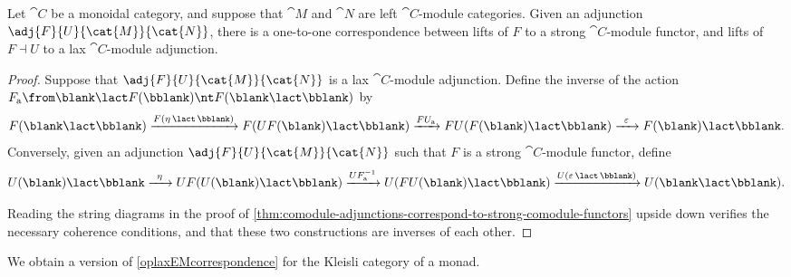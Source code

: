 \begin{proposition}\label{prop:dual-module-adjunctions}
  Let \(\cat{C}\) be a monoidal category,
  and suppose that \(\cat{M}\) and \(\cat{N}\) are left
  \(\cat{C}\)\hyp{}module categories.
  Given an adjunction \(\adj{F}{U}{\cat{M}}{\cat{N}}\),
  there is a one-to-one correspondence between
  lifts of \(F\) to a strong \(\cat{C}\)\hyp{}module functor,
  and lifts of \(F \dashv U\) to a lax \(\cat{C}\)\hyp{}module adjunction.
\end{proposition}
\begin{proof}
  Suppose that \(\adj{F}{U}{\cat{M}}{\cat{N}}\) is a lax \(\cat{C}\)\hyp{}module adjunction.
  Define the inverse of the action \(F_{\mathrm{a}} \from \blank \lact F(\bblank) \nt F(\blank \lact \bblank)\)
  by
  \[
    F(\blank \lact \bblank)
    \xrightarrow{F(\eta \,\lact\, \bblank)} F(UF(\blank) \lact \bblank)
    \xrightarrow{F U_{\mathrm{a}}} FU(F(\blank) \lact \bblank)
    \xrightarrow{\;\;\varepsilon\;\;} F(\blank) \lact \bblank.
  \]
  Conversely, given an adjunction \(\adj{F}{U}{\cat{M}}{\cat{N}}\)
  such that \(F\) is a strong \(\cat{C}\)\hyp{}module functor,
  define
  \[
    U(\blank) \lact \bblank
    \xrightarrow{\;\;\eta\;\;} UF(U(\blank) \lact \bblank)
    \xrightarrow{U F_{\mathrm{a}}^{-1}} U(FU(\blank) \lact \bblank)
    \xrightarrow{U(\varepsilon \,\lact\, \bblank)} U(\blank \lact \bblank).
  \]

  Reading the string diagrams in the proof of \cref{thm:comodule-adjunctions-correspond-to-strong-comodule-functors} upside down
  verifies the necessary coherence conditions,
  and that these two constructions are inverses of each other.
\end{proof}

We obtain a version of \cref{oplaxEMcorrespondence}
for the Kleisli category of a monad.

